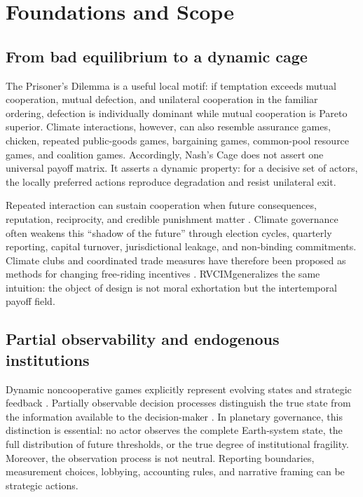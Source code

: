 \documentclass[11pt,a4paper]{article}
\numberwithin{equation}{section}
\theoremstyle{definition}
\theoremstyle{plain}
\theoremstyle{remark}
\newcommand{\RVCIM}{\textsc{RVCIM}}
\begin{document}
\section{Foundations and Scope}

\subsection{From bad equilibrium to a dynamic cage}

The Prisoner's Dilemma is a useful local motif: if temptation exceeds mutual cooperation, mutual defection, and unilateral cooperation in the familiar ordering, defection is individually dominant while mutual cooperation is Pareto superior. Climate interactions, however, can also resemble assurance games, chicken, repeated public-goods games, bargaining games, common-pool resource games, and coalition games. Accordingly, Nash's Cage does not assert one universal payoff matrix. It asserts a dynamic property: for a decisive set of actors, the locally preferred actions reproduce degradation and resist unilateral exit.

Repeated interaction can sustain cooperation when future consequences, reputation, reciprocity, and credible punishment matter \citep{axelrod1984,ostrom1990}. Climate governance often weakens this ``shadow of the future'' through election cycles, quarterly reporting, capital turnover, jurisdictional leakage, and non-binding commitments. Climate clubs and coordinated trade measures have therefore been proposed as methods for changing free-riding incentives \citep{nordhaus2015}. \RVCIM generalizes the same intuition: the object of design is not moral exhortation but the intertemporal payoff field.

\subsection{Partial observability and endogenous institutions}

Dynamic noncooperative games explicitly represent evolving states and strategic feedback \citep{basar1999}. Partially observable decision processes distinguish the true state from the information available to the decision-maker \citep{kaelbling1998}. In planetary governance, this distinction is essential: no actor observes the complete Earth-system state, the full distribution of future thresholds, or the true degree of institutional fragility. Moreover, the observation process is not neutral. Reporting boundaries, measurement choices, lobbying, accounting rules, and narrative framing can be strategic actions.
\end{document}
